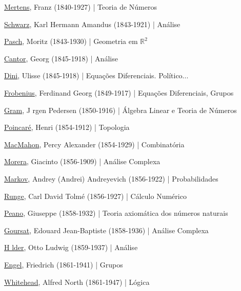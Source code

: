 \documentclass[12pt,a4paper]{article}
\begin{document}
			\href{http://en.wikipedia.org/wiki/Franz_Mertens}{Mertens}, Franz (1840-1927) | Teoria de N\'umeros

			\href{http://pt.wikipedia.org/wiki/Hermann_Amandus_Schwarz}{Schwarz}, Karl Hermann Amandus (1843-1921) | An\'alise

			\href{http://en.wikipedia.org/wiki/Moritz_Pasch}{Pasch}, Moritz (1843-1930) | Geometria em $ \mathbb{R}^2 $

			\href{http://pt.wikipedia.org/wiki/Georg_Cantor}{Cantor}, Georg (1845-1918) | An\'alise

			\href{http://pt.wikipedia.org/wiki/Ulisse_Dini}{Dini}, Ulisse (1845-1918) | Equa\c{c}\~oes Diferenciais. Pol\'itico...

			\href{http://en.wikipedia.org/wiki/Ferdinand_Georg_Frobenius}{Frobenius}, Ferdinand Georg (1849-1917) | Equa\c{c}\~oes Diferenciais, Grupos

			\href{http://en.wikipedia.org/wiki/J\%C3\%B8rgen_Pedersen_Gram}{Gram}, J rgen Pedersen (1850-1916) | \'Algebra Linear e Teoria de N\'umeros

			\href{http://pt.wikipedia.org/wiki/Henri_Poincar\%C3\%A9}{Poincar\'e}, Henri (1854-1912) | Topologia

			\href{http://en.wikipedia.org/wiki/Percy_MacMahon}{MacMahon}, Percy Alexander (1854-1929) | Combinat\'oria

			\href{http://en.wikipedia.org/wiki/Giacinto_Morera}{Morera}, Giacinto (1856-1909) | An\'alise Complexa

			\href{http://en.wikipedia.org/wiki/Andrey_Markov}{Markov}, Andrey (Andrei) Andreyevich (1856-1922) | Probabilidades

			\href{http://en.wikipedia.org/wiki/Carl_Runge}{Runge}, Carl David Tolm\'e (1856-1927) | C\'alculo Num\'erico

			\href{http://pt.wikipedia.org/wiki/Peano}{Peano}, Giuseppe (1858-1932) | Teoria axiom\'atica dos n\'umeros naturais

			\href{http://en.wikipedia.org/wiki/Goursat}{Goursat}, Edouard Jean-Baptiste (1858-1936) | An\'alise Complexa

			\href{http://pt.wikipedia.org/wiki/Otto_H\%C3\%B6lder}{H lder}, Otto Ludwig (1859-1937) | An\'alise

			\href{http://en.wikipedia.org/wiki/Friedrich_Engel_(mathematician)}{Engel}, Friedrich (1861-1941) | Grupos

			\href{http://en.wikipedia.org/wiki/A.N._Whitehead}{Whitehead}, Alfred North (1861-1947) | L\'ogica
\end{document}

